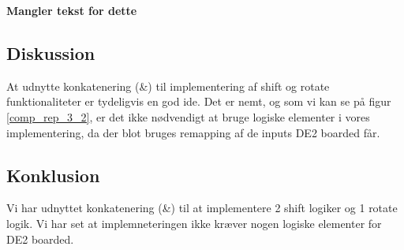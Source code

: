\documentclass[../journal2.tex]{subfiles}
\begin{document}
\textbf{Mangler tekst for dette}


\subsection{Diskussion}

At udnytte konkatenering (\&) til implementering af shift og rotate funktionaliteter er tydeligvis en god ide. Det er nemt, og som vi kan se på figur \ref{comp_rep_3_2}, er det ikke nødvendigt at bruge logiske elementer i vores implementering, da der blot bruges remapping af de inputs DE2 boarded får.


\subsection{Konklusion}

Vi har udnyttet konkatenering (\&) til at implementere 2 shift logiker og 1 rotate logik. Vi har set at implemneteringen ikke kræver nogen logiske elementer for DE2 boarded.
\end{document}
